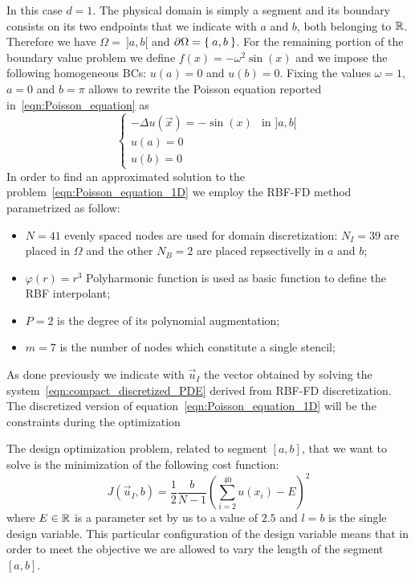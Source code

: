 In this case $d=1$. The physical domain is simply a segment and its boundary consists on its two endpoints that we indicate with $a$ and $b$, both belonging to $\mathbb{R}$. Therefore we have $\Omega =~]a,b[$ and $\partial\Omega = \Set{a, b}$.
For the remaining portion of the boundary value problem we define $f(x) = - \omega^2 \sin(x)$ and we impose the following homogeneous BCs: $u(a)=0$ and $u(b)=0$. Fixing the values $\omega=1$, $a=0$ and $b=\pi$ allows to rewrite the Poisson equation reported in~\eqref{eqn:Poisson_equation} as
\begin{equation}
	\label{eqn:Poisson_equation_1D}
	\begin{cases}
		- \Delta u(\vec{x}) = - \sin(x) & \text{in $]a,b[$}  \\
		u(a) = 0  \\
		u(b) = 0
	\end{cases}
\end{equation}
In order to find an approximated solution to the problem~\eqref{eqn:Poisson_equation_1D} we employ the RBF-FD method parametrized as follow:
\begin{itemize}
	\item $N=41$ evenly spaced nodes are used for domain discretization: $N_I=39$ are placed in $\Omega$ and the other $N_B=2$ are placed repsectivelly in $a$ and $b$;
	\item $\varphi(r) = r^3$ Polyharmonic function is used as basic function to define the RBF interpolant;
	\item $P=2$ is the degree of its polynomial augmentation;
	\item $m=7$ is the number of nodes which constitute a single stencil;
\end{itemize}
As done previously we indicate with $\vec{u}_I$ the vector obtained by solving the system~\eqref{eqn:compact_discretized_PDE} derived from RBF-FD discretization.
The discretized version of equation~\eqref{eqn:Poisson_equation_1D} will be the constraints during the optimization

\smallskip
The design optimization problem, related to segment $[a,b]$, that we want to solve is the minimization of the following cost function:
\begin{equation}
	J(\vec{u}_I, b) = \frac{1}{2} \frac{b}{N-1} \left( \sum_{i=2}^{40} u(x_i) - E \right)^2
\end{equation}
where $E\in\mathbb{R}$ is a parameter set by us to a value of $2.5$ and $l=b$ is the single design variable. This particular configuration of the design variable means that in order to meet the objective we are allowed to vary the length of the segment $[a,b]$.

